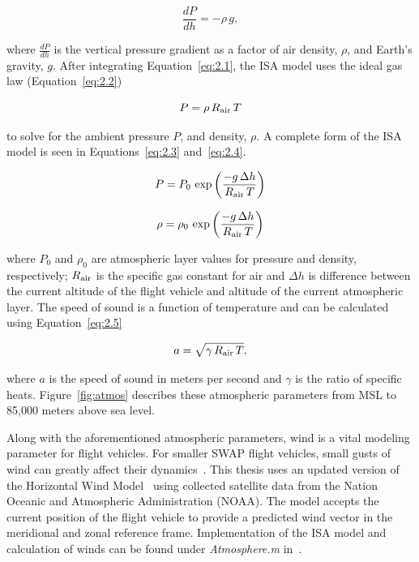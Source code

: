 \documentclass[12pt]{report}
\begin{document}
\begin{equation}
  \frac{dP}{dh} = -\rho \, g,
  \label{eq:2.1}
\end{equation}

where \(\frac{dP}{dh}\) is the vertical pressure gradient as a factor of air density, \( \rho \), and Earth's gravity, \(g\). After integrating Equation~\ref{eq:2.1}, the ISA model uses the ideal gas law (Equation~\ref{eq:2.2})

\begin{equation}
  P = \rho \, R\textsubscript{air} \, T
  \label{eq:2.2}
\end{equation}

to solve for the ambient pressure \(P\), and density, \( \rho \). A complete form of the ISA model is seen in Equations~\ref{eq:2.3} and~\ref{eq:2.4}.

\begin{equation}
  P = P_0\,\exp\left({\frac{-g\,\Delta h}{R\textsubscript{air}\,T}}\right)
  \label{eq:2.3}
\end{equation}

\begin{equation}
  \rho = \rho_0\,\exp\left({\frac{-g\,\Delta h}{R\textsubscript{air}\,T}}\right)
  \label{eq:2.4}
\end{equation}

where \(P_0\) and \(\rho_0\) are atmospheric layer values for pressure and density, respectively; \(R\textsubscript{air}\) is the specific gas constant for air and \(\Delta h\) is difference between the current altitude of the flight vehicle and altitude of the current atmospheric layer. The speed of sound is a function of temperature and can be calculated using Equation~\ref{eq:2.5}

\begin{equation}
  a = \sqrt{\gamma \, R\textsubscript{air}\,T},
  \label{eq:2.5}
\end{equation}

where \(a\) is the speed of sound in meters per second and \( \gamma \) is the ratio of specific heats. Figure~\ref{fig:atmos} describes these atmospheric parameters from MSL to 85,000 meters above sea level.

Along with the aforementioned atmospheric parameters, wind is a vital modeling parameter for flight vehicles. For smaller SWAP flight vehicles, small gusts of wind can greatly affect their dynamics~\cite{raymerAircraftDesignConceptual2018}. This thesis uses an updated version of the Horizontal Wind Model~\cite{drobEmpiricalModelEarth2008,drobUpdateHorizontalWind2015} using collected satellite data from the Nation Oceanic and Atmospheric Administration (NOAA). The model accepts the current position of the flight vehicle to provide a predicted wind vector in the meridional and zonal reference frame. Implementation of the ISA model and calculation of winds can be found under \textit{Atmosphere.m} in~\cite{millerNsm0014thesis1969}.
\end{document}
